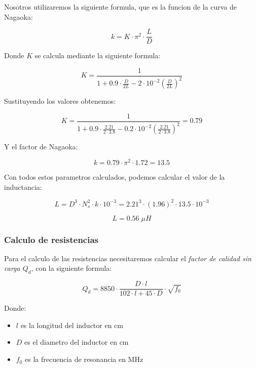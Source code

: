 Nosotros utilizaremos la siguiente formula, que es la funcion de la curva de Nagaoka:

\begin{equation}
    k = K \cdot \pi^2 \cdot \frac{L}{D} 
\end{equation}

Donde $K$ se calcula mediante la siguiente formula:

\begin{equation}
    K = \frac{1}{1 + 0.9 \cdot \frac{D}{2L} - 2 \cdot 10^{-2} \left(\frac{D}{2L}\right)^2}
\end{equation}

Sustituyendo los valores obtenemos:

\begin{equation}
    K = \frac{1}{1 + 0.9 \cdot \frac{2.21}{2 \cdot 3.8} - 0.2 \cdot 10^{-2} \left(\frac{2.21}{2 \cdot 3.8}\right)^2} = 0.79
\end{equation}

Y el factor de Nagaoka:

\begin{equation}
    k = 0.79 \cdot \pi^2 \cdot 1.72 = 13.5
\end{equation}


Con todos estos parametros calculados, podemos calcular el valor de la inductancia:

\begin{equation}
    L = D^3 \cdot N_s^2 \cdot k \cdot 10^{-3} = 2.21^3 \cdot (1.96)^2 \cdot 13.5 \cdot 10^{-3} 
\end{equation}

\begin{equation}
    \boxed{L = 0.56\; \mu H}
\end{equation}

\subsubsection{Calculo de resistencias}

Para el calculo de las resistencias necesitaremos calcular el \textit{factor de calidad sin carga $Q_d$}, con la siguiente formula:

\begin{equation}
    Q_d = 8850 \cdot \frac{D \cdot l}{102 \cdot l + 45 \cdot D} \cdot \sqrt{f_0}
\end{equation}

Donde:

\begin{itemize}
    \item $l$ es la longitud del inductor en cm
    \item $D$ es el diametro del inductor en cm
    \item $f_0$ es la frecuencia de resonancia en MHz
\end{itemize}

